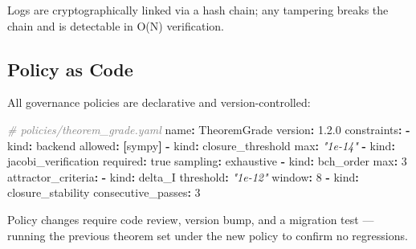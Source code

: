 \documentclass[11pt,a4paper]{article}
\newenvironment{Shaded}{\begin{snugshade}\small}{\end{snugshade}}
\newcommand{\KeywordTok}[1]{\textbf{#1}}
\newcommand{\DecValTok}[1]{#1}
\newcommand{\FloatTok}[1]{#1}
\newcommand{\CharTok}[1]{#1}
\newcommand{\StringTok}[1]{\textit{#1}}
\newcommand{\CommentTok}[1]{\textit{\textcolor{gray}{#1}}}
\newcommand{\FunctionTok}[1]{#1}
\newcommand{\AttributeTok}[1]{#1}
\begin{document}
Logs are cryptographically linked via a hash chain; any tampering breaks
the chain and is detectable in O(N) verification.

\hypertarget{policy-as-code}{%
\subsection{Policy as Code}\label{policy-as-code}}

All governance policies are declarative and version-controlled:

\begin{Shaded}
\begin{Highlighting}[]
\CommentTok{\# policies/theorem\_grade.yaml}
\FunctionTok{name}\KeywordTok{:}\AttributeTok{ TheoremGrade}
\FunctionTok{version}\KeywordTok{:}\AttributeTok{ }\FloatTok{1.2.0}
\FunctionTok{constraints}\KeywordTok{:}
\AttributeTok{  }\KeywordTok{{-}}\AttributeTok{ }\FunctionTok{kind}\KeywordTok{:}\AttributeTok{ backend}
\AttributeTok{    }\FunctionTok{allowed}\KeywordTok{:}\AttributeTok{ }\KeywordTok{[}\AttributeTok{sympy}\KeywordTok{]}
\AttributeTok{  }\KeywordTok{{-}}\AttributeTok{ }\FunctionTok{kind}\KeywordTok{:}\AttributeTok{ closure\_threshold}
\AttributeTok{    }\FunctionTok{max}\KeywordTok{:}\AttributeTok{ }\StringTok{"1e{-}14"}
\AttributeTok{  }\KeywordTok{{-}}\AttributeTok{ }\FunctionTok{kind}\KeywordTok{:}\AttributeTok{ jacobi\_verification}
\AttributeTok{    }\FunctionTok{required}\KeywordTok{:}\AttributeTok{ }\CharTok{true}
\AttributeTok{    }\FunctionTok{sampling}\KeywordTok{:}\AttributeTok{ exhaustive}
\AttributeTok{  }\KeywordTok{{-}}\AttributeTok{ }\FunctionTok{kind}\KeywordTok{:}\AttributeTok{ bch\_order}
\AttributeTok{    }\FunctionTok{max}\KeywordTok{:}\AttributeTok{ }\DecValTok{3}
\FunctionTok{attractor\_criteria}\KeywordTok{:}
\AttributeTok{  }\KeywordTok{{-}}\AttributeTok{ }\FunctionTok{kind}\KeywordTok{:}\AttributeTok{ delta\_I}
\AttributeTok{    }\FunctionTok{threshold}\KeywordTok{:}\AttributeTok{ }\StringTok{"1e{-}12"}
\AttributeTok{    }\FunctionTok{window}\KeywordTok{:}\AttributeTok{ }\DecValTok{8}
\AttributeTok{  }\KeywordTok{{-}}\AttributeTok{ }\FunctionTok{kind}\KeywordTok{:}\AttributeTok{ closure\_stability}
\AttributeTok{    }\FunctionTok{consecutive\_passes}\KeywordTok{:}\AttributeTok{ }\DecValTok{3}
\end{Highlighting}
\end{Shaded}

Policy changes require code review, version bump, and a migration test
--- running the previous theorem set under the new policy to confirm no
regressions.
\end{document}
